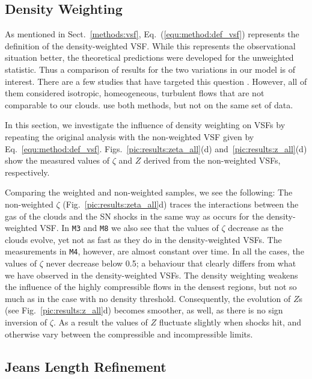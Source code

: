 \documentclass{aa}		%
\begin{document}
\subsection{Density Weighting}\label{results:densweight}

As mentioned in Sect.~\ref{methods:vsf}, Eq.~(\ref{equ:method:def_vsf}) represents the definition of the density-weighted VSF.
While this represents the observational situation better, the theoretical predictions were developed for the unweighted statistic.  Thus a comparison of results for the two variations in our model is of interest.
There are a few studies that have targeted this question 
\citep[e.g.,][]{Benzi1993,Schmidt2008, Benzi2010,Gotoh2002}.  
However, all of them considered isotropic, homeogeneous, turbulent flows that are not comparable to our clouds.
\citet{Padoan2016a} use both methods, but not on the same set of data. 

In this section, we investigate the influence of density weighting on VSFs by repeating the original analysis with the non-weighted VSF given by Eq.~\ref{equ:method:def_vsf}.
Figs.~\ref{pic:results:zeta_all}(d) and~\ref{pic:results:z_all}(d) show the measured values of $\zeta$ and $Z$ derived from the non-weighted VSFs, respectively.

Comparing the weighted and non-weighted samples, we see the following:
The non-weighted $\zeta$ (Fig.~\ref{pic:results:zeta_all}d) traces the interactions between the gas of the clouds and the SN shocks in the same way as occurs for the density-weighted VSF.
In \texttt{M3} and \texttt{M8} we also see that the values of $\zeta$ decrease as the clouds evolve, yet not as fast as they do in the density-weighted VSFs. 
The measurements in \texttt{M4}, however, are almost constant over time. 
In all the cases, the values of $\zeta$ never decrease below 0.5; a behaviour that clearly differs from what we have observed in the density-weighted VSFs. 
The density weighting weakens the influence of the highly compressible flows in the densest regions, but not so much as in the case with no density threshold. 
Consequently, the evolution of $Z$s (see Fig.~\ref{pic:results:z_all}d) becomes smoother, as well, as there is no sign inversion of $\zeta$.
As a result the values of $Z$ fluctuate slightly when shocks hit, and otherwise vary between the compressible and incompressible limits.



\subsection{Jeans Length Refinement}\label{results:refinement}
\end{document}
